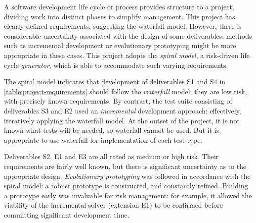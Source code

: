 



A software development life cycle or process provides structure to a project, dividing work into distinct phases to simplify management. This project has clearly defined requirements, suggesting the waterfall model. However, there is considerable uncertainty associated with the design of some deliverables: methods such as incremental development or evolutionary prototyping might be more appropriate in these cases. This project adopts the \emph{spiral model}, a risk-driven life cycle \emph{generator}, which is able to accommodate such varying requirements.

The spiral model indicates that development of deliverables S1 and S4 in \cref{table:project-requirements} should follow the \emph{waterfall} model: they are low risk, with precisely known requirements. By contrast, the test suite consisting of deliverables S3 and E2 used an \emph{incremental} development approach: effectively, iteratively applying the waterfall model. At the outset of the project, it is not known what tests will be needed\footnotemark, so waterfall cannot be used. But it is appropriate to use waterfall for implementation of each test type.

Deliverables S2, E1 and E3 are all rated as medium or high risk. Their requirements are fairly well known, but there is significant uncertainty as to the appropriate design. \emph{Evolutionary prototyping} was followed in accordance with the spiral model: a robust prototype is constructed, and constantly refined\footnotemark. Building a prototype early was invaluable for risk management: for example, it allowed the viability of the incremental solver (extension E1) to be confirmed before committing significant development time.

